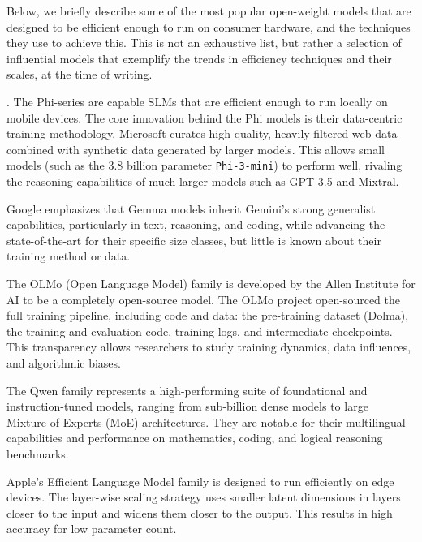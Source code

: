 Below, we briefly describe some of the most popular open-weight models that are designed to be efficient enough to run on consumer hardware, and the techniques they use to achieve this. This is not an exhaustive list, but rather a selection of influential models that exemplify the trends in efficiency techniques and their scales, at the time of writing.
\begin{description}[font=\bfseries]
    \item[Phi series] \citep{abdin2024phi3technicalreporthighly}. The Phi-series are  capable SLMs that are efficient enough to run locally on mobile devices. The core innovation behind the Phi models is their data-centric training methodology. Microsoft  curates high-quality, heavily filtered web data combined with synthetic data generated by larger models. This allows small models (such as the 3.8 billion parameter \texttt{Phi-3-mini}) to perform well, rivaling the reasoning capabilities of much larger models such as GPT-3.5 and Mixtral.
    \item[Gemma series] \citep{gemmateam2024gemmaopenmodelsbased} Google emphasizes that Gemma models inherit Gemini's strong generalist capabilities, particularly in text, reasoning, and coding, while advancing the state-of-the-art for their specific size classes, but little is known about their training method or data.
    \item[OLMo family] \citep{olmo2025olmo3} The OLMo (Open Language Model) family is developed by the Allen Institute for AI to be a completely open-source model. The OLMo project open-sourced the full training pipeline, including code and data: the pre-training dataset  (Dolma), the training and evaluation code, training logs, and  intermediate checkpoints. This transparency allows researchers to study training dynamics, data influences, and algorithmic biases.
    \item[Qwen series] \citep{bai2023qwentechnicalreport} The Qwen family represents a high-performing suite of foundational and instruction-tuned models, ranging from sub-billion dense models to large Mixture-of-Experts (MoE) architectures. They are notable for their  multilingual capabilities and performance on mathematics, coding, and logical reasoning benchmarks.
    \item[OpenELM] \citep{mehta2024openelmefficientlanguagemodel} Apple's Efficient Language Model family is designed  to run efficiently on edge devices. The layer-wise scaling strategy uses smaller latent dimensions in layers closer to the input and widens them closer to the output. This results in high accuracy for low  parameter count.

\end{description}
